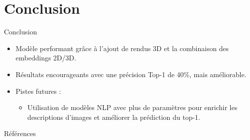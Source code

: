 \documentclass{beamer}
\begin{document}
\section{Conclusion}
\begin{frame}{Conclusion}
\begin{itemize}
    \item Modèle performant grâce à l'ajout de rendus 3D et la combinaison des embeddings 2D/3D.
    \item Résultats encourageants avec une précision Top-1 de 40\%, mais améliorable.
    \item Pistes futures :
    \begin{itemize}
        \item Utilisation de modèles NLP avec plus de paramètres pour enrichir les descriptions d'images et améliorer la prédiction du top-1.
    \end{itemize}
\end{itemize}
\end{frame}

\begin{frame}{Références}
    \footnotesize
    \nocite{BiRefNet}
\end{frame}
\end{document}
